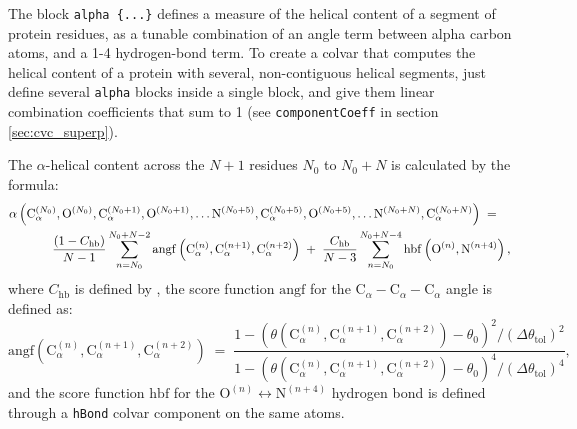 The block \texttt{alpha~\{...\}} defines a measure of the helical content of a segment of
protein residues, as a tunable combination of an angle term between alpha carbon atoms, and a
1-4 hydrogen-bond term.
To create a colvar that computes the helical content of a protein with several,
non-contiguous helical segments, just define several \texttt{alpha} blocks inside a single  block,
and give them linear combination coefficients that sum to 1 (see \texttt{componentCoeff} in section \ref{sec:cvc_superp}).

The $\alpha$-helical content across the $N+1$ residues $N_{0}$ to $N_{0}+N$ is calculated by the formula:
\begin{eqnarray}
  \label{eq:colvars_alpha}
  {
    \alpha\left(
      \mathrm{C}_{\alpha}^{(N_{0})},
      \mathrm{O}^{(N_{0})},
      \mathrm{C}_{\alpha}^{(N_{0}+1)},
      \mathrm{O}^{(N_{0}+1)},
      \ldots
      \mathrm{N}^{(N_{0}+5)},
      \mathrm{C}_{\alpha}^{(N_{0}+5)},
      \mathrm{O}^{(N_{0}+5)},
      \ldots
      \mathrm{N}^{(N_{0}+N)},
      \mathrm{C}_{\alpha}^{(N_{0}+N)}
    \right)
  } \; = \; \; \; \; \\ \; \; \; \; {
    \nonumber
    \frac{(1-C_{\text{hb}})}{N-1}
    \sum_{n=N_{0}}^{N_{0}+N-2}
    \mathrm{angf}\left(
        \mathrm{C}_{\alpha}^{(n)},
        \mathrm{C}_{\alpha}^{(n+1)},
        \mathrm{C}_{\alpha}^{(n+2)}\right)
  } \; + \; {
    \frac{C_{\text{hb}}}{N-3}
    \sum_{n=N_{0}}^{N_{0}+N-4}
    \mathrm{hbf}\left(
      \mathrm{O}^{(n)},
      \mathrm{N}^{(n+4)}\right) \mathrm{,}
  } \\
\end{eqnarray}
where $C_{\text{hb}}$ is defined by ,
the score function $\mathrm{angf}$ for the $\mathrm{C}_{\alpha} -
\mathrm{C}_{\alpha} - \mathrm{C}_{\alpha}$ angle is defined as:
\begin{equation}
  \label{eq:colvars_alpha_Calpha}
  {
    \mathrm{angf}\left(
      \mathrm{C}_{\alpha}^{(n)},
      \mathrm{C}_{\alpha}^{(n+1)},
      \mathrm{C}_{\alpha}^{(n+2)}\right)
  } \; = \; {
    \frac{1 - \left(\theta(
        \mathrm{C}_{\alpha}^{(n)},
        \mathrm{C}_{\alpha}^{(n+1)},
        \mathrm{C}_{\alpha}^{(n+2)}) -
        \theta_{0}\right)^{2} /
      \left(\Delta\theta_{\mathrm{tol}}\right)^{2}}{
      1 - \left(\theta(
        \mathrm{C}_{\alpha}^{(n)},
        \mathrm{C}_{\alpha}^{(n+1)},
        \mathrm{C}_{\alpha}^{(n+2)}) -
        \theta_{0}\right)^{4} /
      \left(\Delta\theta_{\mathrm{tol}}\right)^{4}} \mathrm{,}
  }
\end{equation}
and the score function $\mathrm{hbf}$ for the $\mathrm{O}^{(n)} \leftrightarrow
\mathrm{N}^{(n+4)}$ hydrogen bond is defined through a \texttt{hBond}
colvar component on the same atoms.



